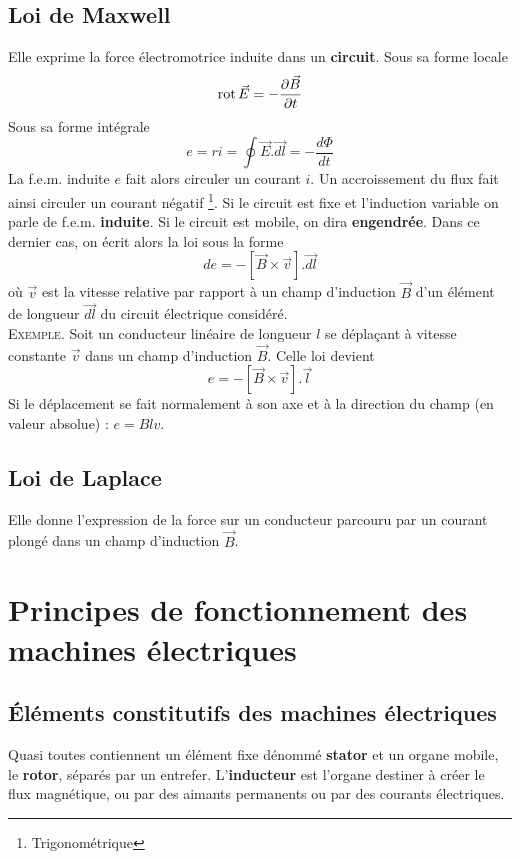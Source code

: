 	\subsection{Loi de Maxwell}
	Elle exprime la force électromotrice induite dans un \textbf{circuit}. 
	Sous sa forme locale 
	\begin{equation}
	\rot \vec{E} = -\frac{\partial \vec{B}}{\partial t}
	\end{equation}
	Sous sa forme intégrale 
	\begin{equation}
	e = ri = \oint \vec{E}.\vec{dl} = -\frac{d\Phi}{dt}
	\end{equation}
	La f.e.m. induite $e$ fait alors circuler un courant $i$. Un 
	accroissement du flux fait ainsi circuler un courant négatif
	\footnote{Trigonométrique}. Si le circuit est fixe et l'induction 
	variable on parle de f.e.m. \textbf{induite}. Si le circuit est 
	mobile, on dira \textbf{engendrée}. Dans ce dernier cas, on écrit 
	alors la loi sous la forme
	\begin{equation}
	de = -[\vec{B}\times\vec{v}].\vec{dl}
	\end{equation}
	où $\vec{v}$ est la vitesse relative par rapport à un champ d'induction 
	$\vec{B}$ d'un élément de longueur $\vec{dl}$ du circuit électrique 
	considéré.\\
	\textsc{Exemple}. Soit un conducteur linéaire de longueur $l$ se 
	déplaçant à vitesse constante $\vec{v}$ dans un champ d'induction $\vec{
	B}$. Celle loi devient 
	\begin{equation}
	e = -[\vec{B}\times\vec{v}].\vec{l}
	\end{equation}
	Si le déplacement se fait normalement à son axe et à la direction 
	du champ (en valeur absolue) : $e = Blv$.
	
	
	\subsection{Loi de Laplace}
	Elle donne l'expression de la force sur un conducteur parcouru par 
	un courant plongé dans un champ d'induction $\vec{B}$.
	
	
\section{Principes de fonctionnement des machines électriques}
	\subsection{Éléments constitutifs des machines électriques}
	Quasi toutes contiennent un élément fixe dénommé \textbf{stator} 
	et un organe mobile, le \textbf{rotor}, séparés par un entrefer. 
	L'\textbf{inducteur} est l'organe destiner à créer le flux 
	magnétique, ou par des aimants permanents ou par des courants 
	électriques.
	

